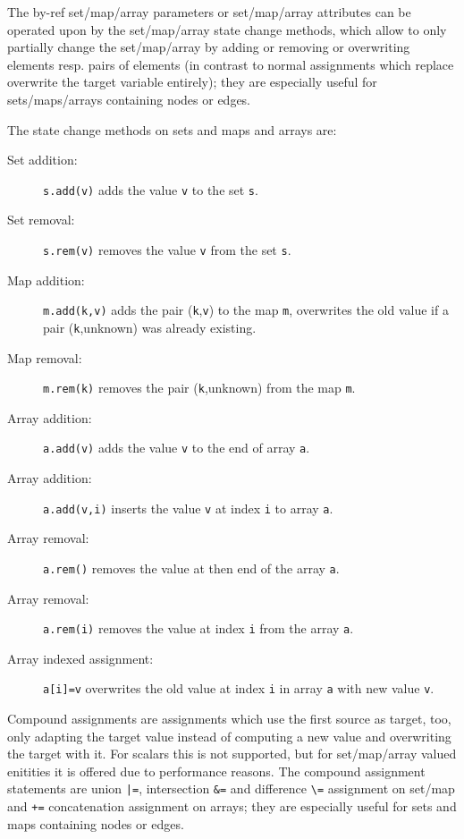 The by-ref set/map/array parameters or set/map/array attributes can be operated upon by the set/map/array state change methods,
which allow to only partially change the set/map/array by adding or removing or overwriting elements resp. pairs of elements (in contrast to normal assignments which replace overwrite the target variable entirely);
they are especially useful for sets/maps/arrays containing nodes or edges.

\noindent The state change methods on sets and maps and arrays are:

\begin{description}
\item[Set addition:] \texttt{s.add(v)} adds the value \texttt{v} to the set \texttt{s}.
\item[Set removal:] \texttt{s.rem(v)} removes the value \texttt{v} from the set \texttt{s}.
\item[Map addition:] \texttt{m.add(k,v)} adds the pair (\texttt{k},\texttt{v}) to the map \texttt{m}, overwrites the old value if a pair (\texttt{k},unknown) was already existing.
\item[Map removal:] \texttt{m.rem(k)} removes the pair (\texttt{k},unknown) from the map \texttt{m}.
\item[Array addition:] \texttt{a.add(v)} adds the value \texttt{v} to the end of array \texttt{a}.
\item[Array addition:] \texttt{a.add(v,i)} inserts the value \texttt{v} at index \texttt{i} to array \texttt{a}.
\item[Array removal:] \texttt{a.rem()} removes the value at then end of the array \texttt{a}.
\item[Array removal:] \texttt{a.rem(i)} removes the value at index \texttt{i} from the array \texttt{a}.
\item[Array indexed assignment:] \texttt{a[i]=v} overwrites the old value at index \texttt{i} in array \texttt{a} with new value \texttt{v}.
\end{description}


Compound assignments are assignments which use the first source as target, too,
only adapting the target value instead of computing a new value and overwriting the target with it.
For scalars this is not supported, but for set/map/array valued enitities it is offered due to performance reasons.
The compound assignment statements are union \verb#|=#, intersection \verb#&=# and difference \verb#\=# assignment on set/map and \verb#+=# concatenation assignment on arrays; they are especially useful for sets and maps containing nodes or edges.

